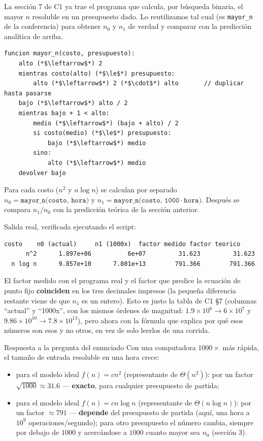 \documentclass[11pt]{article}
\begin{document}
La sección 7 de C1 ya trae el programa que calcula, por búsqueda binaria, el mayor $n$ resoluble en un
presupuesto dado. Lo reutilizamos tal cual (es \texttt{mayor\_n} de la conferencia) para obtener $n_0$ y
$n_1$ de verdad y comparar con la predicción analítica de arriba.

\begin{lstlisting}[style=pseudo]
funcion mayor_n(costo, presupuesto):
    alto (*$\leftarrow$*) 2
    mientras costo(alto) (*$\le$*) presupuesto:
        alto (*$\leftarrow$*) 2 (*$\cdot$*) alto       // duplicar hasta pasarse
    bajo (*$\leftarrow$*) alto / 2
    mientras bajo + 1 < alto:
        medio (*$\leftarrow$*) (bajo + alto) / 2
        si costo(medio) (*$\le$*) presupuesto:
            bajo (*$\leftarrow$*) medio
        sino:
            alto (*$\leftarrow$*) medio
    devolver bajo
\end{lstlisting}

Para cada costo ($n^2$ y $n\log n$) se calculan por separado
$n_0=\texttt{mayor\_n(costo, hora)}$ y
$n_1=\texttt{mayor\_n(costo, 1000}\cdot\texttt{hora)}$.
Después se compara $n_1/n_0$ con la predicción teórica de la sección anterior.

Salida real, verificada ejecutando el script:

\begin{lstlisting}[style=salida]
    costo    n0 (actual)     n1 (1000x)  factor medido factor teorico
      n^2      1.897e+06          6e+07         31.623         31.623
  n log n      9.857e+10      7.801e+13        791.366        791.366
\end{lstlisting}

El factor medido con el programa real y el factor que predice la ecuación de punto fijo
\textbf{coinciden} en los tres decimales impresos (la pequeña diferencia restante viene de que $n_1$
es un entero). Esto es justo la tabla de C1 §7 (columnas ``actual'' y ``1000x'', con los
mismos órdenes de magnitud: $1.9\times10^6\to 6\times10^7$ y $9.86\times10^{10}\to 7.8\times10^{13}$),
pero ahora con la fórmula que explica por qué esos números son esos y no otros, en vez de solo leerlos de
una corrida.

\begin{resultado}{Respuesta a la pregunta del enunciado}
Con una computadora $1000\times$ más rápida, el tamaño de entrada resoluble en una hora crece:
\begin{itemize}[leftmargin=14pt]
\item para el modelo ideal $f(n)=c n^2$ (representante de $\Theta(n^2)$): por un factor
$\sqrt{1000}\approx 31.6$ --- \textbf{exacto}, para cualquier presupuesto de partida;
\item para el modelo ideal $f(n)=c n\log n$ (representante de $\Theta(n\log n)$): por un factor
$\approx 791$ --- \textbf{depende} del presupuesto de partida
(aquí, una hora a $10^9$ operaciones/segundo); para otro presupuesto el número cambia, siempre por debajo
de $1000$ y acercándose a $1000$ cuanto mayor sea $n_0$ (sección 3).
\end{itemize}
\end{resultado}
\end{document}
